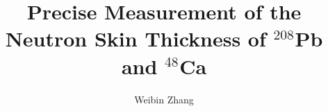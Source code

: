 \documentclass[phd,bottom,nosig,dvipsnames]{usbthesis}
\author{Weibin Zhang}%
\title{Precise Measurement of the Neutron Skin Thickness of $^{208}$Pb and $^{48}$Ca}%
\begin{document}
\singlespacing %
\maketitle %
\makeapproval %

\begin{abstract}

\end{abstract}
\tableofcontents %
\listoffigures %
%
%
\begin{acknowledgements}
    
\end{acknowledgements}
\pagestyle{thesis}
\newpage
{}
\setlength{\baselineskip}{15.pt}
% 








\renewcommand{\baselinestretch}{1}
\normalsize

\clearpage
\newpage
{}%
%


\clearpage
\newpage

\appendix

%
\end{document}
